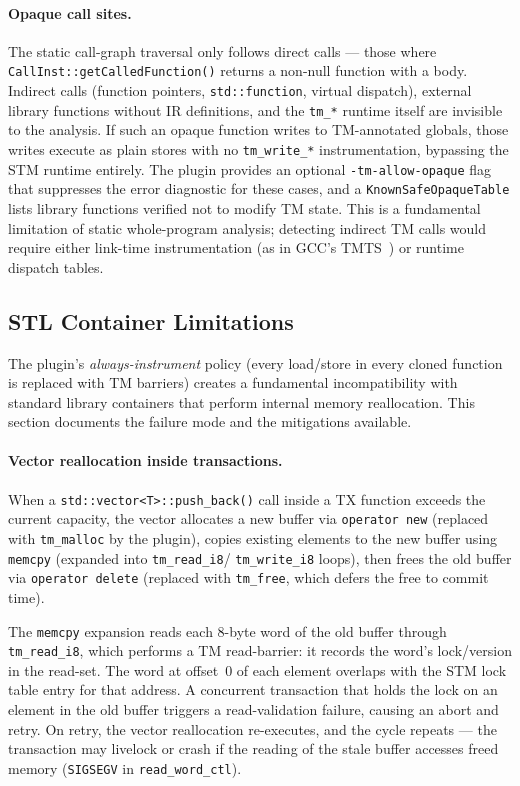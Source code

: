 \documentclass[article,12pt]{article}
\begin{document}
\paragraph{Opaque call sites.}
The static call-graph traversal only follows direct calls --- those where
\texttt{CallInst::getCalledFunction()} returns a non-null function with
a body.  Indirect calls (function pointers, \texttt{std::function},
virtual dispatch), external library functions without IR definitions,
and the \texttt{tm\_*} runtime itself are invisible to the analysis.
If such an opaque function writes to TM-annotated globals, those writes
execute as plain stores with no \texttt{tm\_write\_*} instrumentation,
bypassing the STM runtime entirely.  The plugin provides an optional
\texttt{-tm-allow-opaque} flag that suppresses the error diagnostic for
these cases, and a \texttt{KnownSafeOpaqueTable} lists library functions
verified not to modify TM state.
This is a fundamental limitation of static whole-program analysis;
detecting indirect TM calls would require either link-time
instrumentation (as in GCC's TMTS~\cite{TMTS}) or runtime dispatch
tables.

\subsection{STL Container Limitations}
\label{sec:stl-limitations}

The plugin's \emph{always-instrument} policy (every load/store in every cloned
function is replaced with TM barriers) creates a fundamental incompatibility with
standard library containers that perform internal memory reallocation.  This
section documents the failure mode and the mitigations available.

\paragraph{Vector reallocation inside transactions.}
When a \texttt{std::vector<T>::push\_back()} call inside a TX function exceeds
the current capacity, the vector allocates a new buffer via \texttt{operator new}
(replaced with \texttt{tm\_malloc} by the plugin), copies existing elements to
the new buffer using \texttt{memcpy} (expanded into \texttt{tm\_read\_i8}/
\texttt{tm\_write\_i8} loops), then frees the old buffer via \texttt{operator
delete} (replaced with \texttt{tm\_free}, which defers the free to commit time).

The \texttt{memcpy} expansion reads each 8-byte word of the old buffer through
\texttt{tm\_read\_i8}, which performs a TM read-barrier: it records the word's
lock/version in the read-set.  The word at offset~0 of each element overlaps
with the STM lock table entry for that address.  A concurrent transaction that
holds the lock on an element in the old buffer triggers a read-validation
failure, causing an abort and retry.  On retry, the vector reallocation
re-executes, and the cycle repeats --- the transaction may livelock or crash
if the reading of the stale buffer accesses freed memory (\texttt{SIGSEGV}
in \texttt{read\_word\_ctl}).
\end{document}
